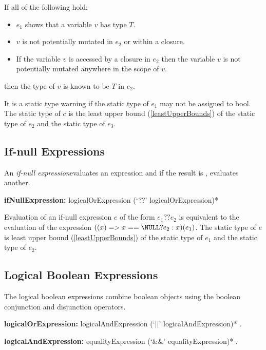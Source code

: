 \documentclass{article}
\newcommand{\code}[1]{{\sf #1}}
\begin{document}
\LMHash{}
If all of the following hold:
\begin{itemize}
\item $e_1$ shows that a variable $v$ has type $T$.
\item $v$ is not potentially mutated in $e_2$ or within a closure.
\item If the variable $v$ is accessed by a closure in $e_2$ then the variable $v$ is not potentially mutated anywhere in the scope of $v$.
\end{itemize}

then the type of $v$ is known to be $T$ in $e_2$.


\LMHash{}
 It is a static type warning if the static type of $e_1$ may not be assigned to \code{bool}.  The static type of $c$ is the least upper bound (\ref{leastUpperBounds}) of the static type of $e_2$ and the static type of $e_3$.
 
   
 \subsection{If-null Expressions}
 \label{ifNull}
 
 \LMHash{}
 An {\em if-null expression}evaluates an expression and if the result is \NULL, evaluates another.

\begin{grammar}
{\bf ifNullExpression:}
  logicalOrExpression (`??' logicalOrExpression)*
\end{grammar}
  
\LMHash{}
Evaluation of an if-null expression $e$ of the form $e_1??e_2 $ is equivalent to the evaluation of the expression $((x) => x == \NULL? e_2: x)(e_1)$. The static type of $e$ is least upper bound (\ref{leastUpperBounds}) of the static type of $e_1$ and the static type of $e_2$.
  

\subsection{ Logical Boolean Expressions}

\LMHash{}
The logical boolean expressions combine boolean objects using the boolean conjunction and disjunction operators.

\begin{grammar}
{\bf logicalOrExpression:}
      logicalAndExpression (`$||$' logicalAndExpression)*
    .


{\bf logicalAndExpression:}
      equalityExpression (`\&\&' equalityExpression)*
    .
 \end{grammar}
 
\end{document}
